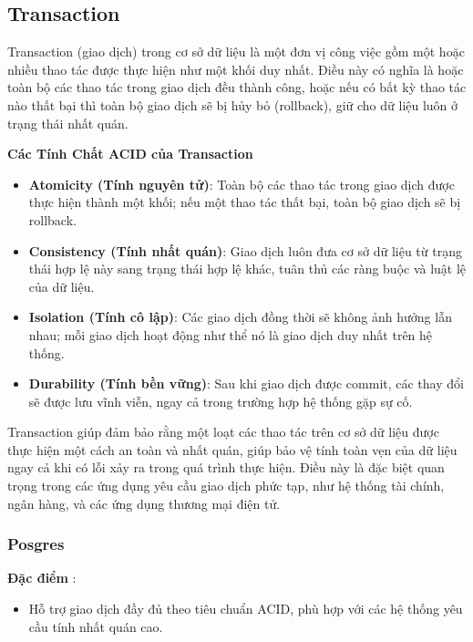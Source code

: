 \subsection{Transaction}

Transaction (giao dịch) trong cơ sở dữ liệu là một đơn vị công việc gồm một hoặc nhiều thao tác được thực hiện như một khối duy nhất. Điều này có nghĩa là hoặc toàn bộ các thao tác trong giao dịch đều thành công, hoặc nếu có bất kỳ thao tác nào thất bại thì toàn bộ giao dịch sẽ bị hủy bỏ (rollback), giữ cho dữ liệu luôn ở trạng thái nhất quán.

\noindent
\textbf{Các Tính Chất ACID của Transaction}

\begin{itemize}
    \item \textbf{Atomicity (Tính nguyên tử)}: Toàn bộ các thao tác trong giao dịch được thực hiện thành một khối; nếu một thao tác thất bại, toàn bộ giao dịch sẽ bị rollback.
    \item \textbf{Consistency (Tính nhất quán)}: Giao dịch luôn đưa cơ sở dữ liệu từ trạng thái hợp lệ này sang trạng thái hợp lệ khác, tuân thủ các ràng buộc và luật lệ của dữ liệu.
    \item \textbf{Isolation (Tính cô lập)}: Các giao dịch đồng thời sẽ không ảnh hưởng lẫn nhau; mỗi giao dịch hoạt động như thể nó là giao dịch duy nhất trên hệ thống.
    \item \textbf{Durability (Tính bền vững)}: Sau khi giao dịch được commit, các thay đổi sẽ được lưu vĩnh viễn, ngay cả trong trường hợp hệ thống gặp sự cố.
\end{itemize}

Transaction giúp đảm bảo rằng một loạt các thao tác trên cơ sở dữ liệu được thực hiện một cách an toàn và nhất quán, giúp bảo vệ tính toàn vẹn của dữ liệu ngay cả khi có lỗi xảy ra trong quá trình thực hiện. Điều này là đặc biệt quan trọng trong các ứng dụng yêu cầu giao dịch phức tạp, như hệ thống tài chính, ngân hàng, và các ứng dụng thương mại điện tử.

\subsubsection{Posgres}


\textbf{Đặc điểm} : 
\begin{itemize}
    \item Hỗ trợ giao dịch đầy đủ theo tiêu chuẩn ACID, phù hợp với các hệ thống yêu cầu tính nhất quán cao.
\end{itemize}

